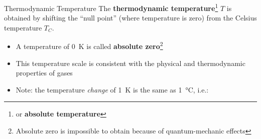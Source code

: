 \documentclass[12pt,aspectratio=169]{beamer}
\newcommand{\eq}[2]{\vspace{#1}{\Large\begin{displaymath}#2\end{displaymath}}}
\begin{document}
\begin{frame}{Thermodynamic Temperature}
  The \textbf{thermodynamic temperature}\footnote{or \textbf{absolute
      temperature}} $T$
  is obtained by shifting the ``null point'' (where temperature is zero) from
  the Celsius temperature $T_C$. %
  
  \eq{-.2in}{
    \boxed{T = T_C + 273.15}
  }
  \begin{itemize}
  \item\vspace{-.1in}A temperature of \SI{0}{\kelvin} is called
    \textbf{absolute zero}\footnote{Absolute zero is impossible to obtain
      because of quantum-mechanic effects}
  \item This temperature scale is consistent with the physical and
    thermodynamic properties of gases
  \item Note: the temperature \emph{change} of \SI{1}{\kelvin} is the same as
    \SI{1}{\celsius}, i.e.:

    \eq{-.25in}{
      \Delta T=\Delta T_C
    }
  \end{itemize}
  \vspace{.25in}
\end{frame}
  


%
%
\end{document}
